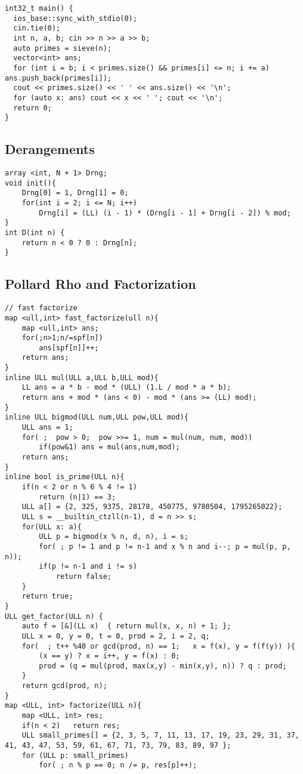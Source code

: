 \documentclass[10pt,a4paper,onesided]{article}
\begin{document}
\begin{multicols*}{3}
\begin{lstlisting}
int32_t main() {
  ios_base::sync_with_stdio(0);
  cin.tie(0);
  int n, a, b; cin >> n >> a >> b;
  auto primes = sieve(n);
  vector<int> ans;
  for (int i = b; i < primes.size() && primes[i] <= n; i += a) ans.push_back(primes[i]);
  cout << primes.size() << ' ' << ans.size() << '\n';
  for (auto x: ans) cout << x << ' '; cout << '\n';
  return 0;
}
\end{lstlisting}
\subsection{Derangements}
\begin{lstlisting}
array <int, N + 1> Drng;
void init(){
    Drng[0] = 1, Drng[1] = 0;
    for(int i = 2; i <= N; i++)
        Drng[i] = (LL) (i - 1) * (Drng[i - 1] + Drng[i - 2]) % mod;
}
int D(int n) { 
    return n < 0 ? 0 : Drng[n];
}\end{lstlisting}
\subsection{Pollard Rho and Factorization}
\begin{lstlisting}
// fast factorize
map <ull,int> fast_factorize(ull n){
    map <ull,int> ans;
    for(;n>1;n/=spf[n])
        ans[spf[n]]++;
    return ans;
}
inline ULL mul(ULL a,ULL b,ULL mod){
    LL ans = a * b - mod * (ULL) (1.L / mod * a * b);
    return ans + mod * (ans < 0) - mod * (ans >= (LL) mod);
}
inline ULL bigmod(ULL num,ULL pow,ULL mod){
    ULL ans = 1;
    for( ;  pow > 0;  pow >>= 1, num = mul(num, num, mod))
        if(pow&1) ans = mul(ans,num,mod);
    return ans;
}
inline bool is_prime(ULL n){
    if(n < 2 or n % 6 % 4 != 1) 
        return (n|1) == 3;
    ULL a[] = {2, 325, 9375, 28178, 450775, 9780504, 1795265022};
    ULL s = __builtin_ctzll(n-1), d = n >> s;
    for(ULL x: a){
        ULL p = bigmod(x % n, d, n), i = s;
        for( ; p != 1 and p != n-1 and x % n and i--; p = mul(p, p, n));
        if(p != n-1 and i != s)
            return false;
    }
    return true;
}
ULL get_factor(ULL n) {
    auto f = [&](LL x)  { return mul(x, x, n) + 1; };
    ULL x = 0, y = 0, t = 0, prod = 2, i = 2, q;
    for(  ; t++ %40 or gcd(prod, n) == 1;   x = f(x), y = f(f(y)) ){
        (x == y) ? x = i++, y = f(x) : 0;
        prod = (q = mul(prod, max(x,y) - min(x,y), n)) ? q : prod;
    }
    return gcd(prod, n);
}
map <ULL, int> factorize(ULL n){
    map <ULL, int> res;
    if(n < 2)   return res;
    ULL small_primes[] = {2, 3, 5, 7, 11, 13, 17, 19, 23, 29, 31, 37, 41, 43, 47, 53, 59, 61, 67, 71, 73, 79, 83, 89, 97 };
    for (ULL p: small_primes)
        for( ; n % p == 0; n /= p, res[p]++);


\end{lstlisting}
\end{multicols*}
\end{document}
